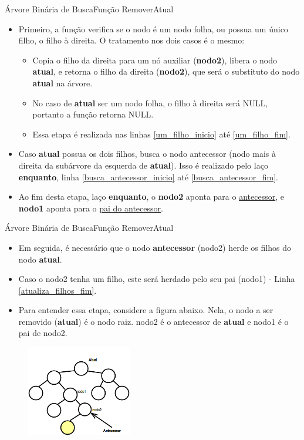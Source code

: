 \documentclass[aspectratio=169]{beamer}
\begin{document}
\begin{frame}{Árvore Binária de Busca}{Função RemoverAtual}
\begin{itemize}
 \item Primeiro, a função verifica se o nodo é um nodo folha, ou possua um único filho, o filho à direita. O tratamento nos dois casos é o mesmo:
 \begin{itemize}
 \item Copia o filho da direita para um nó auxiliar ({\bf nodo2}), libera o nodo {\bf atual}, e retorna o filho da direita ({\bf nodo2}), que será o substituto do nodo {\bf atual} na árvore.
 \item No caso de {\bf atual} ser um nodo folha, o filho à direita será NULL, portanto a função retorna NULL.
 \item Essa etapa é realizada nas linhas \ref{um_filho_inicio} até \ref{um_filho_fim}.
 \end{itemize}
 \item Caso {\bf atual} possua os dois filhos, busca o nodo antecessor (nodo mais à direita da subárvore da esquerda de {\bf atual}). Isso é realizado pelo laço {\bf enquanto}, linha \ref{busca_antecessor_inicio} até \ref{busca_antecessor_fim}.
 \item Ao fim desta etapa, laço {\bf enquanto}, o {\bf nodo2} aponta para o \underline{antecessor}, e {\bf nodo1} aponta para o \underline{pai do antecessor}.
\end{itemize}
\end{frame}


\begin{frame}{Árvore Binária de Busca}{Função RemoverAtual}
\begin{itemize}
 \item Em seguida, é necessário que o nodo {\bf antecessor} (nodo2) herde os filhos do nodo {\bf atual}.
 \item Caso o nodo2 tenha um filho, este será herdado pelo seu pai (nodo1) - Linha \ref{atualiza_filhos_fim}.
 \item Para entender essa etapa, considere a figura abaixo. Nela, o nodo a ser removido ({\bf atual}) é o nodo raiz. nodo2 é o antecessor de {\bf atual} e nodo1 é o pai de nodo2.
\end{itemize}
\begin{figure}[!h]
  \centering
  \includegraphics[width=130pt]{imagens/remover_atual1.png}
  \label{fig_remover_atual1}
\end{figure}
\end{frame}
\end{document}
